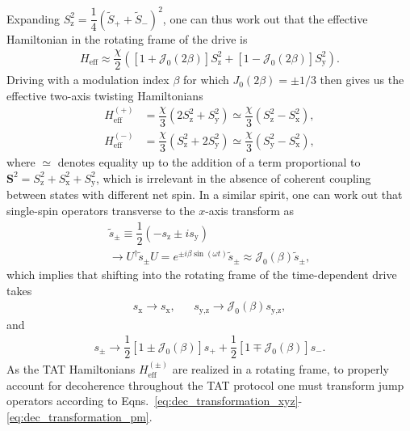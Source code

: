 \documentclass[aps,prx,superscriptaddress,notitlepage,twocolumn,longbibliography]{revtex4-2}
\renewcommand{\t}{\text} %
\newcommand{\f}[2]{\dfrac{#1}{#2}} %
\newcommand{\p}[1]{\left(#1\right)} %
\renewcommand{\sp}[1]{\left[#1\right]} %
\renewcommand{\v}{\bm} %
\newcommand{\J}{\mathcal{J}}
\newcommand{\z}{\text{z}}
\newcommand{\x}{\text{x}}
\newcommand{\y}{\text{y}}
\begin{document}
Expanding $S_\z^2=\f14\p{\tilde S_+ + \tilde S_-}^2$, one can thus work out that the effective Hamiltonian in the rotating frame of the drive is
\begin{align}
  H_{\t{eff}}
  \approx \f{\chi}{2} \p{\sp{1+\J_0\p{2\beta}} S_\z^2
  + \sp{1-\J_0\p{2\beta}} S_\y^2}.
\end{align}
Driving with a modulation index $\beta$ for which $J_0\p{2\beta}=\pm1/3$ then gives us the effective two-axis twisting Hamiltonians
\begin{align}
  H_{\t{eff}}^{(+)}
  &= \f{\chi}{3} \p{2 S_\z^2 + S_\y^2}
  \simeq \f{\chi}{3} \p{S_\z^2 - S_\x^2}, \\
  H_{\t{eff}}^{(-)}
  &= \f{\chi}{3} \p{S_\z^2 + 2 S_\y^2}
  \simeq \f{\chi}{3} \p{S_\y^2 - S_\x^2},
\end{align}
where $\simeq$ denotes equality up to the addition of a term proportional to $\v S^2=S_\z^2+S_\x^2+S_\y^2$, which is irrelevant in the absence of coherent coupling between states with different net spin.
In a similar spirit, one can work out that single-spin operators transverse to the $x$-axis transform as
\begin{multline}
  \tilde s_\pm
  \equiv \f12\p{-s_\z\pm i s_\y} \\
  \to U^\dag \tilde s_\pm U
  = e^{\pm i\beta\sin\p{\omega t}} \tilde s_\pm
  \approx \J_0\p{\beta} \tilde s_\pm,
\end{multline}
which implies that shifting into the rotating frame of the time-dependent drive takes
\begin{align}
  s_\x \to s_\x,
  &&
  s_{\y,\z} \to \J_0\p{\beta} s_{\y,\z},
  \label{eq:dec_transformation_xyz}
\end{align}
and
\begin{align}
  s_\pm
  \to \f12\sp{1 \pm \J_0\p{\beta}} s_+
  + \f12\sp{1 \mp \J_0\p{\beta}} s_-.
  \label{eq:dec_transformation_pm}
\end{align}
As the TAT Hamiltonians $H_{\t{eff}}^{(\pm)}$ are realized in a rotating frame, to properly account for decoherence throughout the TAT protocol one must transform jump operators according to Eqns.~\eqref{eq:dec_transformation_xyz}-\eqref{eq:dec_transformation_pm}.
\end{document}
